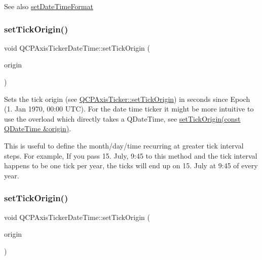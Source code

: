 \begin{DoxySeeAlso}{See also}
\hyperlink{class_q_c_p_axis_ticker_date_time_ad52660a82f688395468674d555f6a86b}{set\+Date\+Time\+Format} 
\end{DoxySeeAlso}
\mbox{\label{class_q_c_p_axis_ticker_date_time_a5388e048cbd32cf1ba730b9f1859eb5c}} 
\subsubsection{\texorpdfstring{set\+Tick\+Origin()}{setTickOrigin()}\hspace{0.1cm}{\footnotesize\ttfamily [1/2]}}
{\footnotesize\ttfamily void Q\+C\+P\+Axis\+Ticker\+Date\+Time\+::set\+Tick\+Origin (\begin{DoxyParamCaption}\item[{double}]{origin }\end{DoxyParamCaption})}

Sets the tick origin (see \hyperlink{class_q_c_p_axis_ticker_ab509c7e500293bf66a8409f0d7c23943}{Q\+C\+P\+Axis\+Ticker\+::set\+Tick\+Origin}) in seconds since Epoch (1. Jan 1970, 00\+:00 U\+TC). For the date time ticker it might be more intuitive to use the overload which directly takes a Q\+Date\+Time, see \hyperlink{class_q_c_p_axis_ticker_date_time_a2ea905872b8171847a49a5e093fb0c48}{set\+Tick\+Origin(const Q\+Date\+Time \&origin)}.

This is useful to define the month/day/time recurring at greater tick interval steps. For example, If you pass 15. July, 9\+:45 to this method and the tick interval happens to be one tick per year, the ticks will end up on 15. July at 9\+:45 of every year. \mbox{\label{class_q_c_p_axis_ticker_date_time_a2ea905872b8171847a49a5e093fb0c48}} 
\subsubsection{\texorpdfstring{set\+Tick\+Origin()}{setTickOrigin()}\hspace{0.1cm}{\footnotesize\ttfamily [2/2]}}
{\footnotesize\ttfamily void Q\+C\+P\+Axis\+Ticker\+Date\+Time\+::set\+Tick\+Origin (\begin{DoxyParamCaption}\item[{const Q\+Date\+Time \&}]{origin }\end{DoxyParamCaption})}

